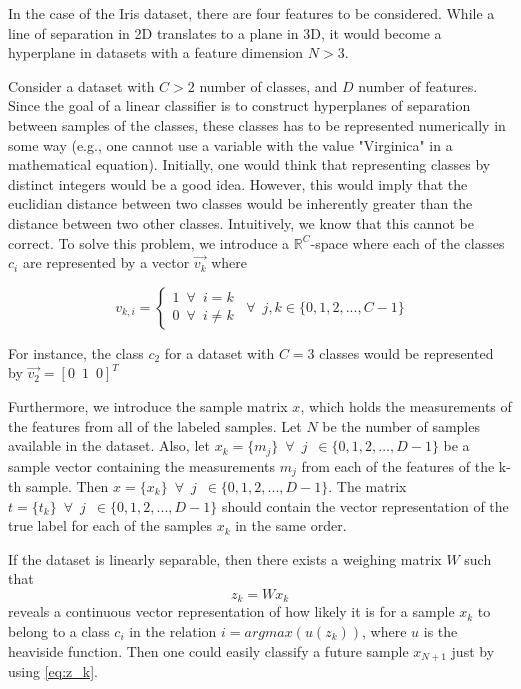 \documentclass{article}
\begin{document}
In the case of the Iris dataset, there are four features to be considered. While a line of separation
in 2D translates to a plane in 3D, it would become a hyperplane in datasets with a feature dimension
$N > 3$.

Consider a dataset with $C > 2$ number of classes, and $D$ number of features. Since the goal of
a linear classifier is to construct hyperplanes of separation between samples of the classes,
these classes has to be represented numerically in some way (e.g., one cannot use a variable
with the value "Virginica" in a mathematical equation). Initially, one would think that
representing classes by distinct integers would be a good idea. However, this would imply
that the euclidian distance between two classes would be inherently greater than the distance
between two other classes. Intuitively, we know that this cannot be correct. To solve this problem,
we introduce a $\mathbb{R}^C$-space where each of the classes $c_i$ are represented by a vector $\vec{v_k}$ where

\begin{equation}
    v_{k,i} = \begin{cases}
        1 \enspace \forall \enspace i = k \\
        0 \enspace \forall \enspace i \neq k
    \end{cases} \enspace \forall \enspace j,k \in \{0, 1, 2, ..., C - 1\}\label{eq:class_vector}
\end{equation}

For instance, the class $c_2$ for a dataset with $C=3$ classes would be represented by
$\vec{v_2} = [ 0\enspace 1\enspace  0 ]^T$

Furthermore, we introduce the sample matrix $x$, which holds the measurements of the features from
all of the labeled samples. Let $N$ be the number of samples available in the dataset. Also,
let $x_k = \{m_j\} \enspace \forall \enspace j \enspace \in \{0, 1, 2, ..., D - 1\}$ be a sample vector containing
the measurements $m_j$ from each of the features of the k-th sample. Then $x = \{x_k\} \enspace \forall \enspace j \enspace
\in \{0, 1, 2, ..., D - 1\}$. The matrix $t = \{t_k\} \enspace \forall \enspace j \enspace
\in \{0, 1, 2, ..., D - 1\}$ should contain the vector representation of the true label for each of the samples
$x_k$ in the same order.

If the dataset is linearly separable, then there exists a weighing matrix $W$ such that
\begin{equation}
    z_k = Wx_k \label{eq:z_k}
\end{equation}
reveals a continuous vector representation of how likely it is for a sample $x_k$ to belong to a class
$c_i$ in the relation $i = argmax(u(z_k))$, where $u$ is the heaviside function. Then one could
easily classify a future sample $x_{N+1}$ just by using \eqref{eq:z_k}.
\end{document}
